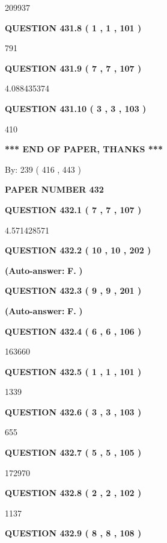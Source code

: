 \documentclass{ctexart}
\begin{document}
209937
  
  
{\textbf{\large{QUESTION
431.8 
 ( 1 , 1 , 101 )
}}}

791
  
  
{\textbf{\large{QUESTION
431.9 
 ( 7 , 7 , 107 )
}}}

4.088435374
  
  
{\textbf{\large{QUESTION
431.10 
 ( 3 , 3 , 103 )
}}}

410
   
   
   
   
\vspace{1.0in} 
{\textbf{\large{ *** END OF PAPER, THANKS *** }}} 
   
   
\hspace{1.0in} By: 
 239 ( 416 ,  443 )
   
   
   
   
\newpage 
\setcounter{page}{ 
   432001 } 
   
   
 {\textbf{ \Large{ PAPER NUMBER  432  }}}
   
   
   
   
  
  
{\textbf{\large{QUESTION
432.1 
 ( 7 , 7 , 107 )
}}}

4.571428571
  
  
{\textbf{\large{QUESTION
432.2 
 ( 10 , 10 , 202 )
}}}
 
 
{\textbf{(Auto-answer:}}
{\textbf{\large{
F.}}}
{\textbf{)}}
 
 
  
  
{\textbf{\large{QUESTION
432.3 
 ( 9 , 9 , 201 )
}}}
 
 
{\textbf{(Auto-answer:}}
{\textbf{\large{
F.}}}
{\textbf{)}}
 
 
  
  
{\textbf{\large{QUESTION
432.4 
 ( 6 , 6 , 106 )
}}}

163660
  
  
{\textbf{\large{QUESTION
432.5 
 ( 1 , 1 , 101 )
}}}

1339
  
  
{\textbf{\large{QUESTION
432.6 
 ( 3 , 3 , 103 )
}}}

655
  
  
{\textbf{\large{QUESTION
432.7 
 ( 5 , 5 , 105 )
}}}

172970
  
  
{\textbf{\large{QUESTION
432.8 
 ( 2 , 2 , 102 )
}}}

1137
  
  
{\textbf{\large{QUESTION
432.9 
 ( 8 , 8 , 108 )
}}}
\end{document}
